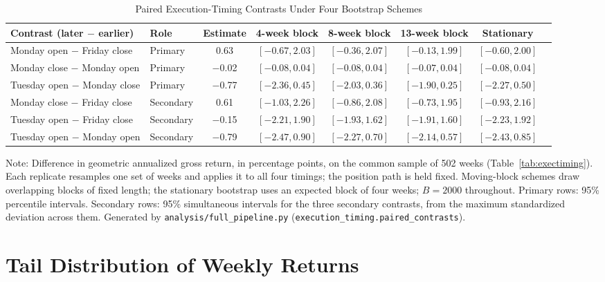 \documentclass[11pt]{article}
\begin{document}
\begin{table}[H]
\centering
\caption{Paired Execution-Timing Contrasts Under Four Bootstrap Schemes}
\label{tab:contrasts}
\scriptsize
\begin{tabular}{@{}llcccccc@{}}
\toprule
Contrast (later $-$ earlier) & Role & Estimate & 4-week block & 8-week block & 13-week block & Stationary \\
\midrule
Monday open $-$ Friday close & Primary & 0.63 & $[-0.67, 2.03]$ & $[-0.36, 2.07]$ & $[-0.13, 1.99]$ & $[-0.60, 2.00]$ \\
Monday close $-$ Monday open & Primary & $-$0.02 & $[-0.08, 0.04]$ & $[-0.08, 0.04]$ & $[-0.07, 0.04]$ & $[-0.08, 0.04]$ \\
Tuesday open $-$ Monday close & Primary & $-$0.77 & $[-2.36, 0.45]$ & $[-2.03, 0.36]$ & $[-1.90, 0.25]$ & $[-2.27, 0.50]$ \\
\midrule
Monday close $-$ Friday close & Secondary & 0.61 & $[-1.03, 2.26]$ & $[-0.86, 2.08]$ & $[-0.73, 1.95]$ & $[-0.93, 2.16]$ \\
Tuesday open $-$ Friday close & Secondary & $-$0.15 & $[-2.21, 1.90]$ & $[-1.93, 1.62]$ & $[-1.91, 1.60]$ & $[-2.23, 1.92]$ \\
Tuesday open $-$ Monday open & Secondary & $-$0.79 & $[-2.47, 0.90]$ & $[-2.27, 0.70]$ & $[-2.14, 0.57]$ & $[-2.43, 0.85]$ \\
\bottomrule
\end{tabular}
\par\vspace{0.3em}
\parbox{\linewidth}{\footnotesize Note: Difference in geometric annualized gross return, in percentage points, on the common sample of 502 weeks (Table~\ref{tab:exectiming}). Each replicate resamples one set of weeks and applies it to all four timings; the position path is held fixed. Moving-block schemes draw overlapping blocks of fixed length; the stationary bootstrap uses an expected block of four weeks; $B = 2000$ throughout. Primary rows: 95\% percentile intervals. Secondary rows: 95\% simultaneous intervals for the three secondary contrasts, from the maximum standardized deviation across them. Generated by \texttt{analysis/full\_pipeline.py} (\texttt{execution\_timing.paired\_contrasts}).}
\end{table}

\section{Tail Distribution of Weekly Returns}
\label{appendix:evt}
\end{document}

